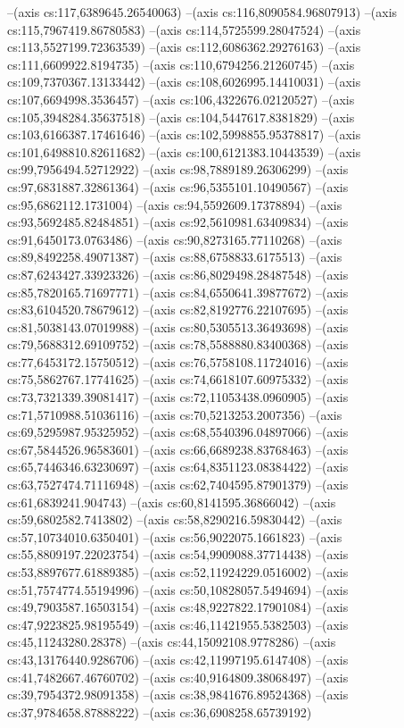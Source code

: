 --(axis cs:117,6389645.26540063)
--(axis cs:116,8090584.96807913)
--(axis cs:115,7967419.86780583)
--(axis cs:114,5725599.28047524)
--(axis cs:113,5527199.72363539)
--(axis cs:112,6086362.29276163)
--(axis cs:111,6609922.8194735)
--(axis cs:110,6794256.21260745)
--(axis cs:109,7370367.13133442)
--(axis cs:108,6026995.14410031)
--(axis cs:107,6694998.3536457)
--(axis cs:106,4322676.02120527)
--(axis cs:105,3948284.35637518)
--(axis cs:104,5447617.8381829)
--(axis cs:103,6166387.17461646)
--(axis cs:102,5998855.95378817)
--(axis cs:101,6498810.82611682)
--(axis cs:100,6121383.10443539)
--(axis cs:99,7956494.52712922)
--(axis cs:98,7889189.26306299)
--(axis cs:97,6831887.32861364)
--(axis cs:96,5355101.10490567)
--(axis cs:95,6862112.1731004)
--(axis cs:94,5592609.17378894)
--(axis cs:93,5692485.82484851)
--(axis cs:92,5610981.63409834)
--(axis cs:91,6450173.0763486)
--(axis cs:90,8273165.77110268)
--(axis cs:89,8492258.49071387)
--(axis cs:88,6758833.6175513)
--(axis cs:87,6243427.33923326)
--(axis cs:86,8029498.28487548)
--(axis cs:85,7820165.71697771)
--(axis cs:84,6550641.39877672)
--(axis cs:83,6104520.78679612)
--(axis cs:82,8192776.22107695)
--(axis cs:81,5038143.07019988)
--(axis cs:80,5305513.36493698)
--(axis cs:79,5688312.69109752)
--(axis cs:78,5588880.83400368)
--(axis cs:77,6453172.15750512)
--(axis cs:76,5758108.11724016)
--(axis cs:75,5862767.17741625)
--(axis cs:74,6618107.60975332)
--(axis cs:73,7321339.39081417)
--(axis cs:72,11053438.0960905)
--(axis cs:71,5710988.51036116)
--(axis cs:70,5213253.2007356)
--(axis cs:69,5295987.95325952)
--(axis cs:68,5540396.04897066)
--(axis cs:67,5844526.96583601)
--(axis cs:66,6689238.83768463)
--(axis cs:65,7446346.63230697)
--(axis cs:64,8351123.08384422)
--(axis cs:63,7527474.71116948)
--(axis cs:62,7404595.87901379)
--(axis cs:61,6839241.904743)
--(axis cs:60,8141595.36866042)
--(axis cs:59,6802582.7413802)
--(axis cs:58,8290216.59830442)
--(axis cs:57,10734010.6350401)
--(axis cs:56,9022075.1661823)
--(axis cs:55,8809197.22023754)
--(axis cs:54,9909088.37714438)
--(axis cs:53,8897677.61889385)
--(axis cs:52,11924229.0516002)
--(axis cs:51,7574774.55194996)
--(axis cs:50,10828057.5494694)
--(axis cs:49,7903587.16503154)
--(axis cs:48,9227822.17901084)
--(axis cs:47,9223825.98195549)
--(axis cs:46,11421955.5382503)
--(axis cs:45,11243280.28378)
--(axis cs:44,15092108.9778286)
--(axis cs:43,13176440.9286706)
--(axis cs:42,11997195.6147408)
--(axis cs:41,7482667.46760702)
--(axis cs:40,9164809.38068497)
--(axis cs:39,7954372.98091358)
--(axis cs:38,9841676.89524368)
--(axis cs:37,9784658.87888222)
--(axis cs:36,6908258.65739192)
